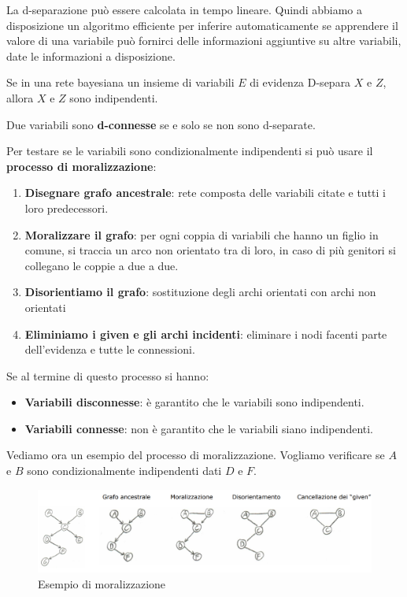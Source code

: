La d-separazione può essere calcolata in tempo lineare. Quindi abbiamo a
disposizione un algoritmo efficiente per inferire automaticamente se apprendere
il valore di una variabile può fornirci delle informazioni aggiuntive su altre
variabili, date le informazioni a disposizione.
\begin{teorema} 
    Se in una rete bayesiana un insieme di variabili $E$ di evidenza D-separa
    $X$ e $Z$, allora $X$ e $Z$ sono indipendenti.
\end{teorema}
\begin{definizione}
    Due variabili sono \textbf{d-connesse} se e solo se non sono d-separate.
\end{definizione}
Per testare se le variabili sono condizionalmente indipendenti si può usare il
\textbf{processo di moralizzazione}:
\begin{enumerate}
    \item \textbf{Disegnare grafo ancestrale}: rete composta delle variabili
          citate e tutti i loro predecessori.
    \item \textbf{Moralizzare il grafo}: per ogni coppia di variabili che hanno
          un figlio in comune, si traccia un arco non orientato tra di loro, in
          caso di più genitori si collegano le coppie a due a due.
    \item \textbf{Disorientiamo il grafo}: sostituzione degli archi orientati
          con archi non orientati
    \item \textbf{Eliminiamo i given e gli archi incidenti}: eliminare i nodi
          facenti parte dell'evidenza e tutte le connessioni.
\end{enumerate}
Se al termine di questo processo si hanno:
\begin{itemize}
    \item \textbf{Variabili disconnesse}: è garantito che le variabili sono
          indipendenti.
    \item \textbf{Variabili connesse}: non è garantito che le variabili siano
          indipendenti.
\end{itemize}
\begin{esempio}
    Vediamo ora un esempio del processo di moralizzazione. Vogliamo verificare
    se $A$ e $B$ sono condizionalmente indipendenti dati $D$ e $F$.
    \begin{figure}[!ht]
        \centering
        \includegraphics[width=1\textwidth]{./img/Reti/Moralizzazione.png}
        \caption{Esempio di moralizzazione}
        \label{fig:moralizzazione}
    \end{figure}
\end{esempio}
